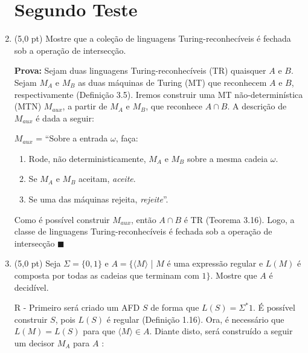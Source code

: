 \documentclass[12pt,a4paper,oneside]{article}
\begin{document}
\begin{enumerate}
	
	\section*{Segundo Teste}
	
	\item (5,0 pt) Mostre que a coleção de linguagens Turing-reconhecíveis é fechada sob a operação de intersecção.
	
	\vspace{0.3cm}
	
	{\color{blue} 
		{\bf Prova:} Sejam duas linguagens Turing-reconhecíveis (TR) quaisquer $A$ e $B$. Sejam $M_A$ e $M_B$ as duas máquinas de Turing (MT) que reconhecem $A$ e $B$, respectivamente (Definição 3.5). Iremos construir uma MT não-determinística (MTN) $M_{aux}$, a partir de $M_A$ e $M_B$, que reconhece $A \cap B$. A descrição de $M_{aux}$ é dada a seguir: 
		
		$M_{aux}$ = ``Sobre a entrada $\omega$, faça:
		\begin{enumerate}
			\item Rode, não deterministicamente, $M_A$ e $M_B$ sobre a mesma cadeia $\omega$. 
			\item Se $M_A$ e $M_B$ aceitam, {\it aceite}. 
			\item Se uma das máquinas rejeita, {\it rejeite}''.
		\end{enumerate} 
		
		Como é possível construir $M_{aux}$, então $A \cap B$ é TR (Teorema 3.16).  Logo, a classe de linguagens Turing-reconhecíveis é fechada sob a operação de intersecção $\blacksquare$
	}
	
	\item (5,0 pt) Seja $\Sigma = \{ 0,1 \}$ e $A = \{\langle M \rangle$ | $M$ é uma expressão regular e $L(M)$ é composta por todas as cadeias que terminam com $1 \}$. Mostre que $A$ é decidível.
	
	\vspace{0.3cm}
	
	{\color{blue}
		R - Primeiro será criado um AFD $S$ de forma que $L(S) = \Sigma^* 1$. É possível construir $S$, pois $L(S)$ é regular (Definição 1.16). Ora, é necessário que $L(M) =  L(S)$ para que $\langle M \rangle \in A$. 	Diante disto, será construído a seguir um decisor $M_A$ para $A$ :
		
}
\end{enumerate}
\end{document}
